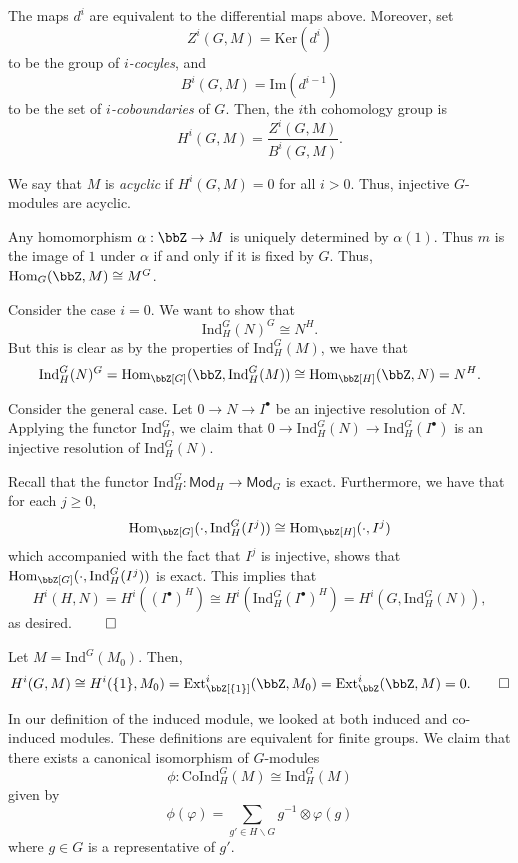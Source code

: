 \documentclass[a4paper, 12pt,oneside,openany]{book}
\begin{document}

The maps $d^i$ are equivalent to the differential maps above. Moreover, set $$Z^i(G, M) = \text{Ker}(d^i)$$ to be the group of \emph{$i$-cocyles}, and $$B^i(G, M) = \text{Im}(d^{i-1})$$ to be the set of \emph{$i$-coboundaries} of $G$. Then, the $i$th cohomology group is $$H^i(G, M) = \frac{Z^i(G, M)}{B^i(G, M)}.$$

We say that $M$ is \emph{acyclic} if $H^i(G, M)=0$ for all $i>0$. Thus, injective $G$-modules are acyclic.


 Any homomorphism $\alpha: \bbZ \to M$ is uniquely determined by $\alpha(1)$. Thus $m$ is the image of $1$ under $\alpha$ if and only if it is fixed by $G$. Thus, $\text{Hom}_G(\bbZ, M) \cong M^G$. 

Consider the case $i=0$. We want to show that $$\text{Ind}_H^G(N)^G \cong N^H.$$ But this is clear as by the properties of $\text{Ind}_H^G(M)$, we have that $$\text{Ind}_H^G(N)^G = \text{Hom}_{\bbZ[G]}(\bbZ, \text{Ind}_H^G(M)) \cong \text{Hom}_{\bbZ[H]}(\bbZ, N) = N^H.$$

Consider the general case. Let $0\to N \to I^\bullet$ be an injective resolution of $N$. Applying the functor $\text{Ind}_H^G$, we claim that $0 \to \text{Ind}_H^G(N) \to \text{Ind}_H^G(I^\bullet)$ is an injective resolution of $\text{Ind}_H^G(N)$.

Recall that the functor $\text{Ind}_H^G: \textsf{Mod}_H \to \textsf{Mod}_G$ is exact. Furthermore, we have that for each $j \geq 0$, $$\text{Hom}_{\bbZ[G]}(\cdot, \text{Ind}_H^G(I^j)) \cong \text{Hom}_{\bbZ[H]}(\cdot, I^j)$$ which accompanied with the fact that $I^j$ is injective, shows that $\text{Hom}_{\bbZ[G]}(\cdot, \text{Ind}_H^G(I^j))$ is exact. This implies that $$H^i(H, N)  = H^i((I^\bullet)^H) \cong H^i(\text{Ind}_H^G(I^\bullet)^H)=H^i(G, \text{Ind}_H^G(N)),$$ as desired. $\qed$


 Let $M=\text{Ind}^G(M_0)$. Then, $$H^i(G, M) \cong H^i(\{1\}, M_0) = \text{Ext}_{\bbZ[\{1\}]}^i(\bbZ, M_0) = \text{Ext}_\bbZ^i(\bbZ, M)=0. \qed$$ 

In our definition of the induced module, we looked at both induced and co-induced modules. These definitions are equivalent for finite groups. We claim that there exists a canonical isomorphism of $G$-modules $$\phi: \text{CoInd}_H^G(M) \cong \text{Ind}_H^G(M)$$ given by $$\phi(\varphi) = \sum\limits_{g' \in H \backslash G} g^{-1} \otimes \varphi(g)$$ where $g \in G$ is a representative of $g'$.
\end{document}

